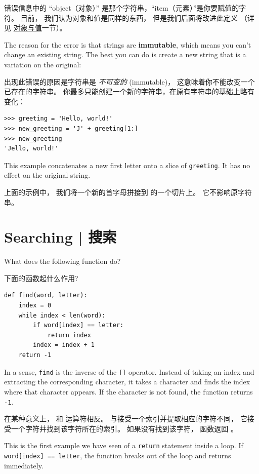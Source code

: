 错误信息中的 ``object（对象）'' 是那个字符串，``item（元素）''是你要赋值的字符。 目前， 我们认为对象和值是同样的东西， 但是我们后面将改进此定义 （详见 \hyperref[equivalence]{对象与值}一节）。

The reason for the error is that
strings are {\bf immutable}, which means you can't change an
existing string.  The best you can do is create a new string
that is a variation on the original:

出现此错误的原因是字符串是 {\em 不可变的} (immutable)， 这意味着你不能改变一个已存在的字符串。 你最多只能创建一个新的字符串，在原有字符串的基础上略有变化：

\begin{lstlisting}
>>> greeting = 'Hello, world!'
>>> new_greeting = 'J' + greeting[1:]
>>> new_greeting
'Jello, world!'
\end{lstlisting}

%
This example concatenates a new first letter onto
a slice of {\tt greeting}.  It has no effect on
the original string.

上面的示例中， 我们将一个新的首字母拼接到  的一个切片上。 它不影响原字符串。


\section{Searching  |  搜索}
\label{find}

What does the following function do?
  

下面的函数起什么作用?

\begin{lstlisting}
def find(word, letter):
    index = 0
    while index < len(word):
        if word[index] == letter:
            return index
        index = index + 1
    return -1
\end{lstlisting}

%
In a sense, {\tt find} is the inverse of the {\tt []} operator.
Instead of taking an index and extracting the corresponding character,
it takes a character and finds the index where that character
appears.  If the character is not found, the function returns {\tt
-1}.

在某种意义上， 和 \li{[]} 运算符相反。 与接受一个索引并提取相应的字符不同， 它接受一个字符并找到该字符所在的索引。 如果没有找到该字符， 函数返回 。

This is the first example we have seen of a {\tt return} statement
inside a loop.  If {\tt word[index] == letter}, the function breaks
out of the loop and returns immediately.

